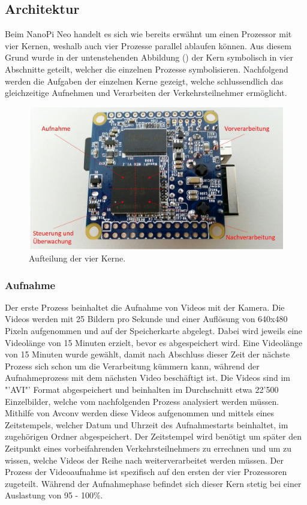 \subsection{Architektur}
Beim NanoPi Neo handelt es sich wie bereits erwähnt um einen Prozessor mit vier Kernen, weshalb auch vier Prozesse parallel ablaufen können. Aus diesem Grund wurde in der untenstehenden Abbildung () der Kern symbolisch in vier Abschnitte geteilt, welcher die einzelnen Prozesse symbolisieren. Nachfolgend werden die Aufgaben der einzelnen Kerne gezeigt, welche schlussendlich das gleichzeitige Aufnehmen und Verarbeiten der Verkehrsteilnehmer ermöglicht.

\begin{figure}[H]
  \centering
  \includegraphics[height=0.49\textwidth]{Software/Architektur.jpg} 
  \caption{Aufteilung der vier Kerne.}
  \label{bArchitektur}
\end{figure}


\subsubsection{Aufnahme}
Der erste Prozess beinhaltet die Aufnahme von Videos mit der Kamera. Die Videos werden mit 25 Bildern pro Sekunde und einer Auflösung von 640x480 Pixeln aufgenommen und auf der Speicherkarte abgelegt. Dabei wird jeweils eine Videolänge von 15 Minuten erzielt, bevor es abgespeichert wird. Eine Videolänge von 15 Minuten wurde gewählt, damit nach Abschluss dieser Zeit der nächste Prozess sich schon um die Verarbeitung kümmern kann, während der Aufnahmeprozess mit dem nächsten Video beschäftigt ist. Die Videos sind im "'AVI"' Format abgespeichert und beinhalten im Durchschnitt etwa 22'500 Einzelbilder, welche vom nachfolgenden Prozess analysiert werden müssen. Mithilfe von Avconv werden diese Videos aufgenommen und mittels eines Zeitstempels, welcher Datum und Uhrzeit des Aufnahmestarts beinhaltet, im zugehörigen Ordner abgespeichert. Der Zeitstempel wird benötigt um später den Zeitpunkt eines vorbeifahrenden Verkehrsteilnehmers zu errechnen und um zu wissen, welche Videos der Reihe nach weiterverarbeitet werden müssen. Der Prozess der Videoaufnahme ist spezifisch auf den ersten der vier Prozessoren zugeteilt. Während der Aufnahmephase befindet sich dieser Kern stetig bei einer Auslastung von 95 - 100\%.

